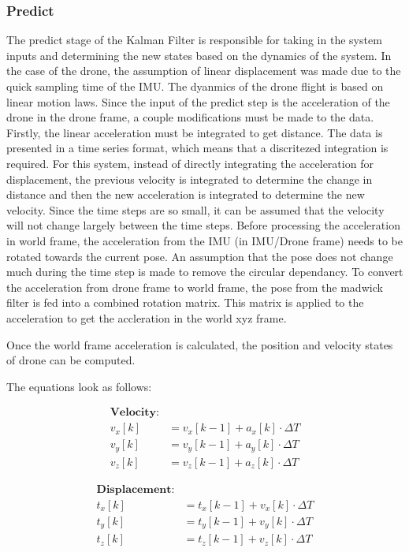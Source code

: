 \documentclass[bare_jrnl_transmag]{subfiles}
\begin{document}
\subsubsection{Predict}
The predict stage of the Kalman Filter is responsible for taking in the system inputs and determining the new states based on the dynamics of the system. In the case of the drone, the assumption of linear displacement was made due to the quick sampling time of the IMU. The dyanmics of the drone flight is based on linear motion laws. Since the input of the predict step is the acceleration of the drone in the drone frame, a couple modifications must be made to the data. Firstly, the linear acceleration must be integrated to get distance. The data is presented in a time series format, which means that a discritezed integration is required. For this system, instead of directly integrating the acceleration for displacement, the previous velocity is integrated to determine the change in distance and then the new acceleration is integrated to determine the new velocity. Since the time steps are so small, it can be assumed that the velocity will not change largely between the time steps. 
Before processing the acceleration in world frame, the acceleration from the IMU (in IMU/Drone frame) needs to be rotated towards the current pose. An assumption that the pose does not change much during the time step is made to remove the circular dependancy. To convert the acceleration from drone frame to world frame, the pose from the madwick filter is fed into a combined rotation matrix. This matrix is applied to the acceleration to get the accleration in the world xyz frame.

Once the world frame acceleration is calculated, the position and velocity states of drone can be computed.

The equations look as follows:


\begin{align*}
    \textbf{Velocity:} \\
    v_x[k] &= v_x[k-1] + a_x[k] \cdot \Delta T \\
    v_y[k] &= v_y[k-1] + a_y[k] \cdot \Delta T \\
    v_z[k] &= v_z[k-1] + a_z[k] \cdot \Delta T
    \end{align*}
    
    \begin{align*}
    \textbf{Displacement:} \\
    t_x[k] &= t_x[k-1] + v_x[k] \cdot \Delta T \\
    t_y[k] &= t_y[k-1] + v_y[k] \cdot \Delta T \\
    t_z[k] &= t_z[k-1] + v_z[k] \cdot \Delta T
\end{align*}
    
\end{document}
